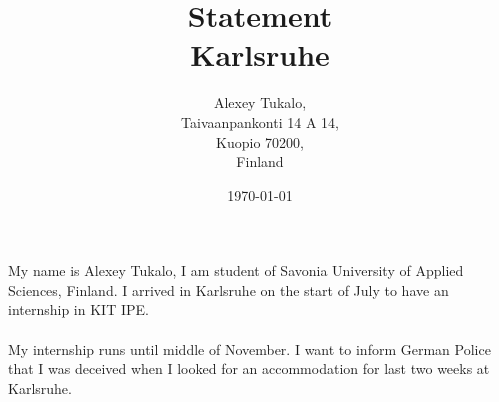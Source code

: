 \documentclass[english]{article}
\date{}
\begin{document}
\title{\vspace{2in}Statement\\\small Karlsruhe\\}

\nopagebreak
\maketitle


\vspace{3in}

\author{
\begin{flushright}
Alexey Tukalo,\\
Taivaanpankonti 14 A 14,\\
Kuopio 70200,\\
Finland
\end{flushright}
}

\date{\today}
\thispagestyle{empty}

\newpage
\setcounter{page}{1}
\setcounter{tocdepth}{2}


\newpage


My name is Alexey Tukalo, I am student of Savonia University of Applied Sciences, Finland. I arrived in Karlsruhe on the start of July to have an internship in KIT IPE.\\\\
My internship runs until middle of November. I want to inform German Police that I was deceived when I looked for an accommodation for last two weeks at Karlsruhe.\\\\
\end{document}
